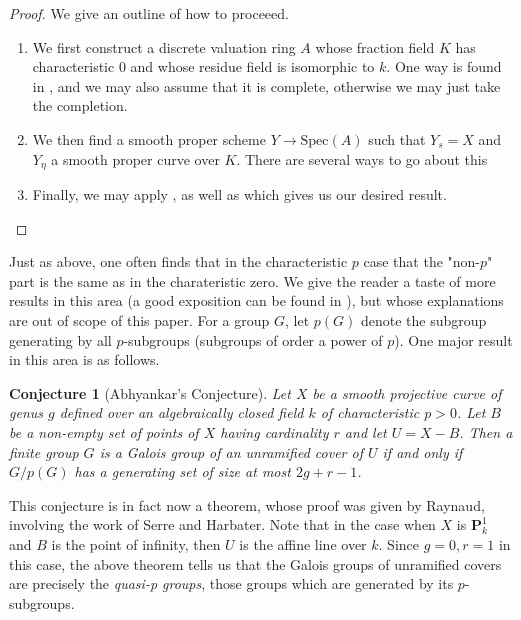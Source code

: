 \documentclass{article}
\theoremstyle{definition}
\theoremstyle{remark}
\theoremstyle{plain}
\newtheorem{conjecture}[theorem]{Conjecture}
\begin{document}
\begin{proof} We give an outline of how to proceeed.
	\begin{enumerate}
		\item We first construct a discrete valuation ring $A$ whose fraction field $K$ has characteristic 0 and whose residue field is isomorphic to $k$.
	One way is found in , and we may also assume that it is complete, otherwise we may just take the completion. 
\item We then find a smooth proper scheme $Y \to \text{Spec}(A)$ such that $Y_{s} = X$ and $Y_{\eta}$ a smooth proper curve over $K$.
	There are several ways to go about this 
\item Finally, we may apply , as well as  which gives us our desired result. 
	\end{enumerate}
	
\end{proof}

Just as above, one often finds that in the characteristic $p$ case that the "non-$p$" part is the same as in the charateristic zero.
We give the reader a taste of more results in this area (a good exposition can be found in  \cite{abhyankar}), but whose explanations are out of scope of this paper.
For a group $G$, let $p(G)$ denote the subgroup generating by all $p$-subgroups (subgroups of order a power of $p$).
One major result in this area is as follows.

\begin{conjecture}[Abhyankar's Conjecture]
	Let $X$ be a smooth projective curve of genus $g$ defined over an algebraically closed field $k$ of characteristic $p > 0$.
	Let $B$ be a non-empty set of points of $X$ having cardinality $r$ and let $U = X - B$.
	Then a finite group $G$ is a Galois group of an unramified cover of $U$ if and only if $G/p(G)$ has a generating set of size at most $2g + r -1$.
\end{conjecture}

This conjecture is in fact now a theorem, whose proof was given by Raynaud, involving the work of Serre and Harbater.
Note that in the case when $X$ is $\textbf{P}_k^1$ and $B$ is the point of infinity, then $U$ is the affine line over $k$.
Since $g = 0, r = 1$ in this case, the above theorem tells us that the Galois groups of unramified covers are precisely the \textit{quasi-p groups}, those groups which are generated by its $p$-subgroups.






\newpage


\end{document}
